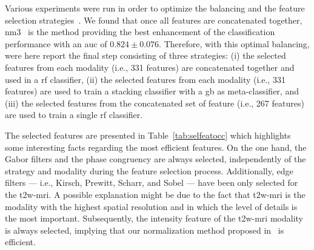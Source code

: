 \documentclass[conference]{sty/ieeeconf}
\begin{document}
Various experiments were run in order to optimize the balancing and
the feature selection strategies~\cite{Lemaitre2016thesis}.
We found that once all features are concatenated together,
\ac{nm3}~\cite{mani2003knn} is the method providing the best
enhancement of the classification performance with an \ac{auc} of $0.824 \pm
0.076$.
Therefore, with this optimal balancing, were here report the
final step consisting of three strategies:
(i) the selected features from each modality (i.e., 331 features) are
concatenated together and used in a \ac{rf} classifier,
(ii) the selected features from each modality (i.e., 331 features) are
used to train a stacking classifier with a \ac{gb} as meta-classifier, and
(iii) the selected features from the concatenated set of feature
(i.e., 267 features) are used to train a single \ac{rf} classifier.

The selected features are presented in Table~\ref{tab:selfeatocc} which
highlights some interesting facts regarding the most efficient features.
On the one hand, the Gabor filters and the phase congruency are always
selected, independently of the strategy and modality during the feature
selection process.
Additionally, edge filters --- i.e., Kirsch, Prewitt, Scharr, and Sobel ---
have been only selected for the \ac{t2w}-\ac{mri}.
A possible explanation might be due to the fact that \ac{t2w}-\ac{mri} is the
modality with the highest spatial resolution and in which the level of details
is the most important.
Subsequently, the intensity feature of the \ac{t2w}-\ac{mri} modality is always
selected, implying that our normalization method proposed
in~\cite{lemaitre2016normalization} is efficient.
\end{document}
